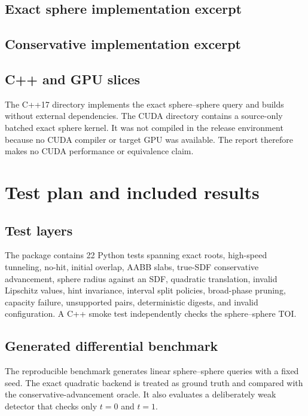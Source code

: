 \documentclass[11pt,a4paper,openany]{book}
\begin{document}
\section{Exact sphere implementation excerpt}


\section{Conservative implementation excerpt}


\section{C++ and GPU slices}
The C++17 directory implements the exact sphere--sphere query and builds without external dependencies. The CUDA directory contains a source-only batched exact sphere kernel. It was not compiled in the release environment because no CUDA compiler or target GPU was available. The report therefore makes no CUDA performance or equivalence claim.

\chapter{Test plan and included results}
\section{Test layers}
The package contains 22 Python tests spanning exact roots, high-speed tunneling, no-hit, initial overlap, AABB slabs, true-SDF conservative advancement, sphere radius against an SDF, quadratic translation, invalid Lipschitz values, hint invariance, interval split policies, broad-phase pruning, capacity failure, unsupported pairs, deterministic digests, and invalid configuration. A C++ smoke test independently checks the sphere--sphere TOI.

\section{Generated differential benchmark}
The reproducible benchmark generates \BenchQueries{} linear sphere--sphere queries with a fixed seed. The exact quadratic backend is treated as ground truth and compared with the conservative-advancement oracle. It also evaluates a deliberately weak detector that checks only $t=0$ and $t=1$.
\end{document}
